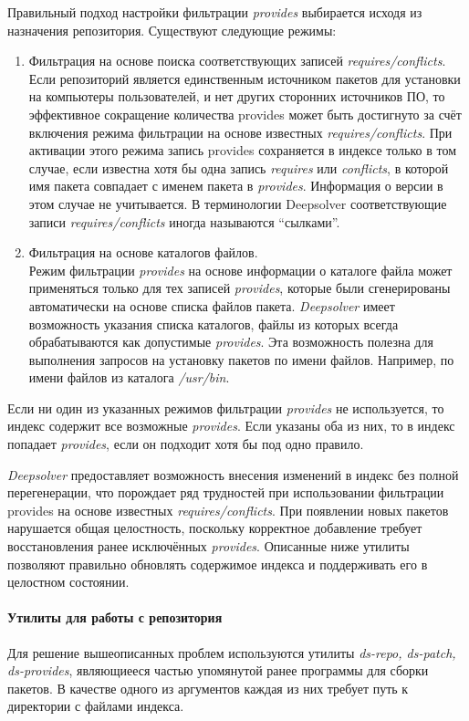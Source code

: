 Правильный подход настройки фильтрации \textit{provides} выбирается исходя
из назначения репозитория. Существуют следующие режимы:
\begin{enumerate}
\item{ Фильтрация на основе поиска соответствующих записей \textit{requires/conflicts}.\\
Если репозиторий является единственным источником пакетов для установки
на компьютеры пользователей, и нет других сторонних источников ПО, 
то эффективное сокращение количества provides может быть
достигнуто за счёт включения режима фильтрации на основе известных
\textit{requires/conflicts}. При активации этого режима запись provides сохраняется
в индексе только в том случае, если известна хотя бы одна запись
\textit{requires} или \textit{conflicts}, в которой имя пакета совпадает с именем пакета
в \textit{provides}. Информация о версии в этом случае не учитывается. В терминологии 
Deepsolver соответствующие записи \textit{requires/conflicts} иногда называются ``сылками''.}
\item{ Фильтрация на основе каталогов файлов.\\
 Режим фильтрации \textit{provides} на основе информации о каталоге файла может применяться только для
тех записей \textit{provides}, которые были сгенерированы автоматически на основе
 списка файлов пакета. \textit{Deepsolver} имеет возможность указания списка
каталогов, файлы из которых всегда обрабатываются как допустимые
\textit{provides}. Эта возможность полезна для выполнения запросов на установку
 пакетов по имени файлов. Например, по имени файлов из каталога
\textit{/usr/bin}.}
\end{enumerate}
Если ни один из указанных режимов фильтрации \textit{provides} не используется,
то индекс содержит все возможные \textit{provides}. Если указаны оба из них, то
в индекс попадает \textit{provides}, если он подходит хотя бы под одно правило.

\textit{Deepsolver} предоставляет возможность внесения изменений в индекс без
полной перегенерации, что порождает ряд трудностей при использовании
фильтрации provides на основе известных \textit{requires/conflicts}. При появлении
новых пакетов нарушается общая целостность, поскольку корректное добавление 
требует восстановления ранее исключённых \textit{provides}. Описанные ниже
утилиты позволяют правильно обновлять содержимое индекса и поддерживать
его в целостном состоянии.

\paragraph{Утилиты для работы с репозитория\\}
Для решение вышеописанных проблем используются утилиты \textit{ds-repo, ds-patch, ds-provides},
являющиееся частью упомянутой ранее программы для сборки пакетов.
В качестве одного из аргументов каждая из них требует путь к директории
 с файлами индекса.\\

